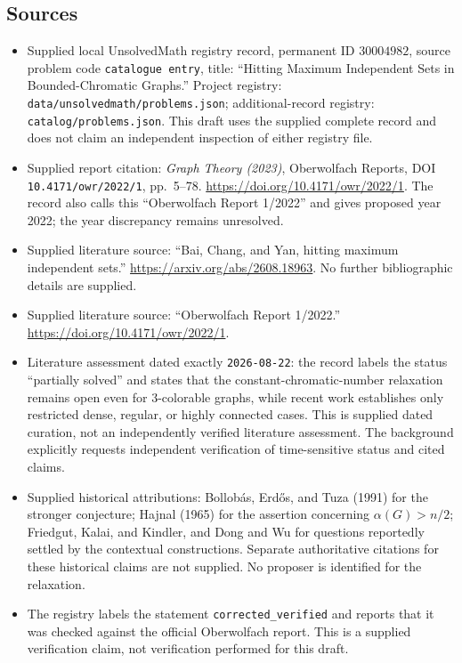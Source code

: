 \documentclass[11pt]{article}
\begin{document}
\subsection{Sources}
\begin{itemize}
\item Supplied local UnsolvedMath registry record, permanent ID \(30004982\), source problem code \texttt{catalogue entry}, title: ``Hitting Maximum Independent Sets in Bounded-Chromatic Graphs.'' Project registry: \texttt{data/unsolvedmath/problems.json}; additional-record registry: \texttt{catalog/problems.json}. This draft uses the supplied complete record and does not claim an independent inspection of either registry file.
\item Supplied report citation: \emph{Graph Theory (2023)}, Oberwolfach Reports, DOI \texttt{10.4171/owr/2022/1}, pp.\ 5--78. \url{https://doi.org/10.4171/owr/2022/1}. The record also calls this ``Oberwolfach Report 1/2022'' and gives proposed year 2022; the year discrepancy remains unresolved.
\item Supplied literature source: ``Bai, Chang, and Yan, hitting maximum independent sets.'' \url{https://arxiv.org/abs/2608.18963}. No further bibliographic details are supplied.
\item Supplied literature source: ``Oberwolfach Report 1/2022.'' \url{https://doi.org/10.4171/owr/2022/1}.
\item Literature assessment dated exactly \texttt{2026-08-22}: the record labels the status ``partially solved'' and states that the constant-chromatic-number relaxation remains open even for \(3\)-colorable graphs, while recent work establishes only restricted dense, regular, or highly connected cases. This is supplied dated curation, not an independently verified literature assessment. The background explicitly requests independent verification of time-sensitive status and cited claims.
\item Supplied historical attributions: Bollob\'as, Erd\H{o}s, and Tuza (1991) for the stronger conjecture; Hajnal (1965) for the assertion concerning \(\alpha(G)>n/2\); Friedgut, Kalai, and Kindler, and Dong and Wu for questions reportedly settled by the contextual constructions. Separate authoritative citations for these historical claims are not supplied. No proposer is identified for the relaxation.
\item The registry labels the statement \texttt{corrected\_verified} and reports that it was checked against the official Oberwolfach report. This is a supplied verification claim, not verification performed for this draft.
\end{itemize}
\end{document}

